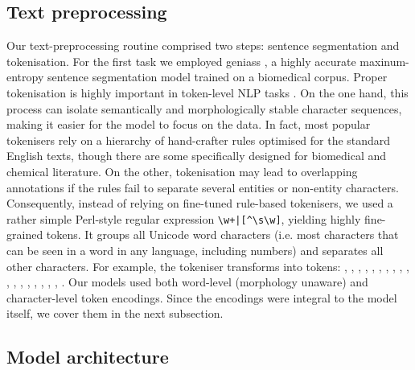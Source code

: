 \documentclass[twocolumn]{bmcart}%
\begin{document}
\subsection*{Text preprocessing}

Our text-preprocessing routine comprised two steps: sentence segmentation and tokenisation.
For the first task we employed geniass \cite{Saetre2007}, a highly accurate maxinum-entropy sentence segmentation model trained on a biomedical corpus.
Proper tokenisation is highly important in token-level NLP tasks \cite{Dai2015}.
On the one hand, this process can isolate semantically and morphologically stable character sequences, making it easier for the model to focus on the data.
In fact, most popular tokenisers rely on a hierarchy of hand-crafter rules optimised for the standard English texts, though there are some specifically designed for biomedical and chemical literature.
On the other, tokenisation may lead to overlapping annotations if the rules fail to separate several entities or non-entity characters.
Consequently, instead of relying on fine-tuned rule-based tokenisers, we used a rather simple Perl-style regular expression \verb=\w+|[^\s\w]=, yielding highly fine-grained tokens. 
It groups all Unicode word characters (i.e. most characters that can be seen in a word in any language, including numbers) and separates all other characters.
For example, the tokeniser transforms  into tokens: , \say{-}, , \say{-}, , \say{-}, , \say{-}, , \say{-}, , \say{[}, , \say{,}, , \say{-}, , \say{]}, .
Our models used both word-level (morphology unaware) and character-level token encodings.
Since the encodings were integral to the model itself, we cover them in the next subsection. 

\subsection*{Model architecture}
\end{document}
